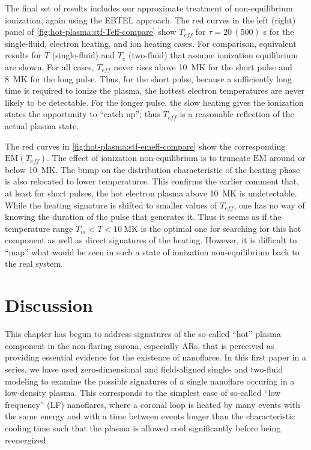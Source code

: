 The final set of results includes our approximate treatment of non-equilibrium ionization, again using the EBTEL approach. The red curves in the left (right) panel of \autoref{fig:hot-plasma:stf-Teff-compare} show $T_{eff}$ for $\tau=20\,(500)$ s for the single-fluid, electron heating, and ion heating cases. For comparison, equivalent results for $T$ (single-fluid) and $T_e$ (two-fluid) that assume ionization equilibrium are shown. For all cases, $T_{eff}$ never rises above \SI{10}{\mega\kelvin} for the short pulse and \SI{8}{\mega\kelvin} for the long pulse. Thus, for the short pulse, because a sufficiently long time is required to ionize the plasma, the hottest electron temperatures are never likely to be detectable. For the longer pulse, the slow heating gives the ionization states the opportunity to ``catch up''; thus $T_{eff}$ is a reasonable reflection of the actual plasma state.

The red curves in \autoref{fig:hot-plasma:stf-emeff-compare} show the corresponding $\mathrm{EM}(T_{eff})$. The effect of ionization non-equilibrium is to truncate  $\mathrm{EM}$ around or below \SI{10}{\mega\kelvin}. The bump on the distribution characteristic of the heating phase is also relocated to lower temperatures. This confirms the earlier comment that, at least for short pulses, the hot electron plasma above \SI{10}{\mega\kelvin} is undetectable. While the heating signature is shifted to smaller values of $T_{eff}$, one has no way of knowing the duration of the pulse that generates it. Thus it seems as if the temperature range $T_m<T<\SI{10}{\mega\kelvin}$ is the optimal one for searching for this hot component as well as direct signatures of the heating. However, it is difficult to ``map'' what would be seen in such a state of ionization non-equilibrium back to the real system.

\section{Discussion}\label{hot-plasma:sec:discussion}

This chapter has begun to address signatures of the so-called ``hot'' plasma component in the non-flaring corona, especially ARs, that is perceived as providing essential evidence for the existence of nanoflares. In this first paper in a series, we have used zero-dimensional and field-aligned single- and two-fluid modeling to examine the possible signatures of a single nanoflare occuring in a low-density plasma. This corresponds to the simplest case of so-called ``low frequency'' (LF) nanoflares, where a coronal loop is heated by many events with the same energy and with a time between events longer than the characteristic cooling time such that the plasma is allowed cool significantly before being reenergized.

